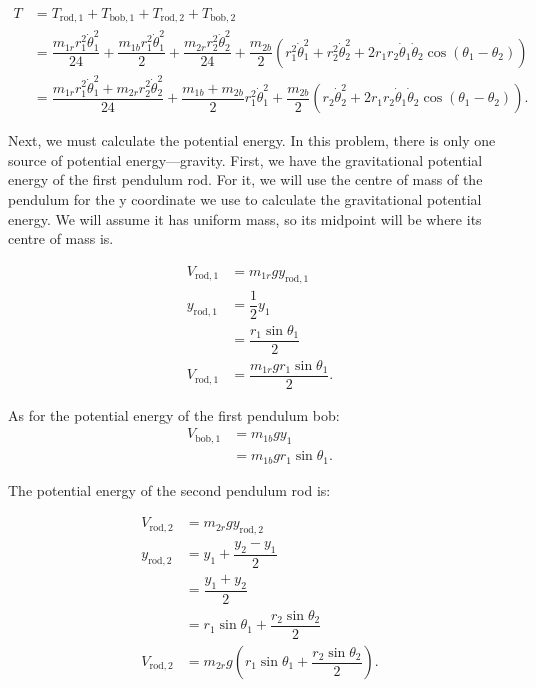 \documentclass[12pt,a4paper,portrait]{article}
\begin{document}
	\begin{align*}
		T &= T_{\mathrm{rod}, 1} + T_{\mathrm{bob}, 1} + T_{\mathrm{rod}, 2} + T_{\mathrm{bob}, 2} \\
		&= \dfrac{m_{1r}r_1^2\dot{\theta}_1^2}{24} + \dfrac{m_{1b} r_1^2 \dot{\theta}_1^2}{2} + \dfrac{m_{2r} r_2^2\dot{\theta}_2^2}{24} + \dfrac{m_{2b}}{2} \left(r_1^2 \dot{\theta}_1^2 + r_2^2 \dot{\theta}_2^2 + 2r_1 r_2 \dot{\theta}_1 \dot{\theta}_2 \cos{\left(\theta_1-\theta_2\right)}\right) \\
		&= \dfrac{m_{1r} r_1^2 \dot{\theta}_1^2 + m_{2r}r_2^2 \dot{\theta}_2^2}{24} + \dfrac{m_{1b}+m_{2b}}{2}r_1^2 \dot{\theta}_1^2 + \dfrac{m_{2b}}{2} \left(r_2\dot{\theta}_2^2 + 2r_1 r_2 \dot{\theta}_1 \dot{\theta}_2 \cos{\left(\theta_1 - \theta_2\right)}\right).
	\end{align*}
	
	Next, we must calculate the potential energy. In this problem, there is only one source of potential energy---gravity. First, we have the gravitational potential energy of the first pendulum rod. For it, we will use the centre of mass of the pendulum for the y coordinate we use to calculate the gravitational potential energy. We will assume it has uniform mass, so its midpoint will be where its centre of mass is. 
	
	\begin{align*}
		V_{\mathrm{rod}, 1} &= m_{1r} gy_{\mathrm{rod}, 1} \\
		y_{\mathrm{rod}, 1} &= \dfrac{1}{2} y_1 \\
		&= \dfrac{r_1 \sin{\theta_1}}{2} \\
		V_{\mathrm{rod}, 1} &= \dfrac{m_{1r}gr_1 \sin{\theta_1}}{2}.
	\end{align*}
	
	As for the potential energy of the first pendulum bob:
	\begin{align*}
		V_{\mathrm{bob}, 1} &= m_{1b} gy_1 \\
		&= m_{1b}gr_1 \sin{\theta_1}.
	\end{align*}
	
	The potential energy of the second pendulum rod is:
	
	\begin{align*}
		V_{\mathrm{rod}, 2} &= m_{2r} gy_{\mathrm{rod}, 2} \\
		y_{\mathrm{rod}, 2} &= y_1 + \dfrac{y_2-y_1}{2}\\
		&= \dfrac{y_1+y_2}{2} \\
		&= r_1 \sin{\theta_1} + \dfrac{r_2\sin{\theta_2}}{2} \\
		V_{\mathrm{rod}, 2} &= m_{2r}g \left(r_1 \sin{\theta_1} + \dfrac{r_2\sin{\theta_2}}{2}\right).
	\end{align*}
	
\end{document}
